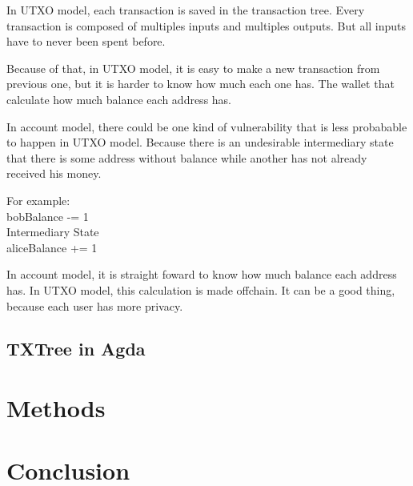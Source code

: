 \documentclass[12pt]{article}
\begin{document}
In UTXO model, each transaction is saved in the transaction tree.
Every transaction is composed of multiples inputs and multiples outputs.
But all inputs have to never been spent before.

Because of that, in UTXO model, it is easy to make a new transaction from previous one, but it is harder to know how much each one has.
The wallet that calculate how much balance each address has.

In account model, there could be one kind of vulnerability that is less probabable to happen in UTXO model.
Because there is an undesirable intermediary state that there is some address without balance while another has not already received his money.

For example: \\
bobBalance -= 1 \\
Intermediary State \\
aliceBalance += 1

In account model, it is straight foward to know how much balance each address has.
In UTXO model, this calculation is made offchain. It can be a good thing,
because each user has more privacy.

\subsection{TXTree in Agda}

\section{Methods}

\section{Conclusion}

\newpage
 


\end{document}
